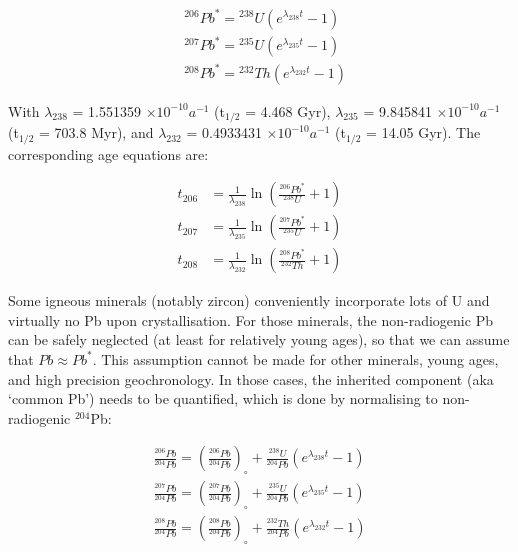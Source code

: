 \documentclass{book}
\begin{document}
\begin{equation}
  \begin{array}{rl}
    &{}^{206}Pb^* = {}^{238}U \left(e^{\lambda_{238}t} - 1\right)\\ 
    &{}^{207}Pb^* = {}^{235}U \left(e^{\lambda_{235}t} - 1\right)\\ 
    &{}^{208}Pb^* = {}^{232}Th \left(e^{\lambda_{232}t} - 1\right)
  \end{array}
  \label{eq:Pb*}
\end{equation}

With $\lambda_{238}$ = 1.551359 $\times 10^{-10} a^{-1}$ (t$_{1/2}$ =
4.468 Gyr), $\lambda_{235}$ = 9.845841 $\times 10^{-10} a^{-1}$
(t$_{1/2}$ = 703.8 Myr), and $\lambda_{232}$ = 0.4933431 $\times
10^{-10} a^{-1}$ (t$_{1/2}$ = 14.05 Gyr). The corresponding age
equations are:

\begin{equation}
  \begin{array}{rl}
    t_{206} & = \frac{1}{\lambda_{238}}
    \ln \left(\frac{{}^{206}Pb^*}{{}^{238}U}+1\right)\\
    t_{207} & = \frac{1}{\lambda_{235}}
    \ln \left(\frac{{}^{207}Pb^*}{{}^{235}U}+1\right)\\
    t_{208} & = \frac{1}{\lambda_{232}}
    \ln \left(\frac{{}^{208}Pb^*}{{}^{232}Th}+1\right)
  \end{array}
  \label{eq:tPb*}
\end{equation}

Some igneous minerals (notably zircon) conveniently incorporate lots
of U and virtually no Pb upon crystallisation. For those minerals, the
non-radiogenic Pb can be safely neglected (at least for relatively
young ages), so that we can assume that $Pb \approx Pb^*$. This
assumption cannot be made for other minerals, young ages, and high
precision geochronology. In those cases, the inherited component (aka
`common Pb') needs to be quantified, which is done by normalising to
non-radiogenic $^{204}$Pb:

\begin{equation}
\begin{array}{c}
  \frac{^{206}Pb}{^{204}Pb} = \left(\frac{^{206}Pb}{^{204}Pb}\right)_\circ +
  \frac{^{238}U}{^{204}Pb} \left(e^{\lambda_{238}t} - 1\right) \\
  \frac{^{207}Pb}{^{204}Pb} = \left(\frac{^{207}Pb}{^{204}Pb}\right)_\circ +
  \frac{^{235}U}{^{204}Pb} \left(e^{\lambda_{235}t} - 1\right)\\
  \frac{^{208}Pb}{^{204}Pb} = \left(\frac{^{208}Pb}{^{204}Pb}\right)_\circ +
  \frac{^{232}Th}{^{204}Pb} \left(e^{\lambda_{232}t} - 1\right)
\end{array}
\label{eq:Pb}
\end{equation}
\end{document}
